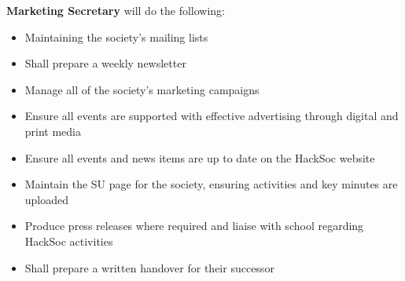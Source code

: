 \begin{subclause}
  \textbf{Marketing Secretary} will do the following:
  \begin{itemize}[label=--,topsep=0em,itemsep=0em]
    \item Maintaining the society's mailing lists
    \item Shall prepare a weekly newsletter
    \item Manage all of the society's marketing campaigns
    \item Ensure all events are supported with effective advertising through digital and print media
    \item Ensure all events and news items are up to date on the HackSoc website
    \item Maintain the SU page for the society, ensuring activities and key minutes are uploaded
    \item Produce press releases where required and liaise with school regarding HackSoc activities
    \item Shall prepare a written handover for their successor
  \end{itemize}
\end{subclause}
